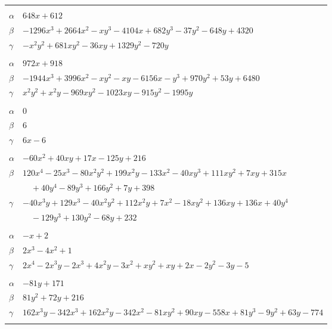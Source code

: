 \documentclass[11pt]{article}
\begin{document}
\begin{longtable}{@{}ll@{}}
\addlinespace[3pt]
\multicolumn{2}{@{}l}{$\{i,j\}=\{2,65\}$, $k_{ij}=2^{2}\cdot 3^{2}\cdot 7^{3}$}\\
$\alpha$ & $648x+612$\\
$\beta$ & $-1296x^{3}+2664x^{2}-xy^{3}-4104x+682y^{3}-37y^{2}-648y+4320$\\
$\gamma$ & $-x^{2}y^{2}+681xy^{2}-36xy+1329y^{2}-720y$\\
\addlinespace[3pt]
\multicolumn{2}{@{}l}{$\{i,j\}=\{2,66\}$, $k_{ij}=2\cdot 3^{3}\cdot 7^{3}$}\\
$\alpha$ & $972x+918$\\
$\beta$ & $-1944x^{3}+3996x^{2}-xy^{2}-xy-6156x-y^{3}+970y^{2}+53y+6480$\\
$\gamma$ & $x^{2}y^{2}+x^{2}y-969xy^{2}-1023xy-915y^{2}-1995y$\\
\addlinespace[3pt]
\multicolumn{2}{@{}l}{$\{i,j\}=\{2,98\}$, $k_{ij}=2\cdot 3\cdot 7$}\\
$\alpha$ & $0$\\
$\beta$ & $6$\\
$\gamma$ & $6x-6$\\
\addlinespace[3pt]
\multicolumn{2}{@{}l}{$\{i,j\}=\{3,21\}$, $k_{ij}=2\cdot 7\cdot 13$}\\
$\alpha$ & $-60x^{2}+40xy+17x-125y+216$\\
$\beta$ & $120x^{4}-25x^{3}-80x^{2}y^{2}+199x^{2}y-133x^{2}-40xy^{3}+111xy^{2}+7xy+315x$\\
 & $\quad +40y^{4}-89y^{3}+166y^{2}+7y+398$\\
$\gamma$ & $-40x^{3}y+129x^{3}-40x^{2}y^{2}+112x^{2}y+7x^{2}-18xy^{2}+136xy+136x+40y^{4}$\\
 & $\quad -129y^{3}+130y^{2}-68y+232$\\
\addlinespace[3pt]
\multicolumn{2}{@{}l}{$\{i,j\}=\{3,22\}$, $k_{ij}=2^{2}$}\\
$\alpha$ & $-x+2$\\
$\beta$ & $2x^{3}-4x^{2}+1$\\
$\gamma$ & $2x^{4}-2x^{3}y-2x^{3}+4x^{2}y-3x^{2}+xy^{2}+xy+2x-2y^{2}-3y-5$\\
\addlinespace[3pt]
\multicolumn{2}{@{}l}{$\{i,j\}=\{3,26\}$, $k_{ij}=3^{2}\cdot 7\cdot 13$}\\
$\alpha$ & $-81y+171$\\
$\beta$ & $81y^{2}+72y+216$\\
$\gamma$ & $162x^{3}y-342x^{3}+162x^{2}y-342x^{2}-81xy^{2}+90xy-558x+81y^{3}-9y^{2}+63y-774$\\
\addlinespace[3pt]
\multicolumn{2}{@{}l}{$\{i,j\}=\{3,45\}$, $k_{ij}=2^{3}\cdot 7^{3}$}\\

\end{longtable}
\end{document}
